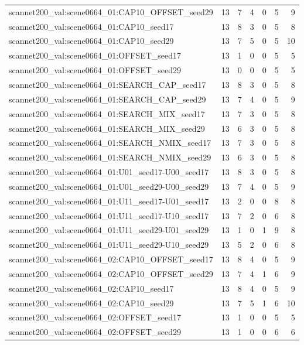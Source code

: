 \begin{table}[t]
\begin{tabular}{lrrrrrr}
scannet200\_val:scene0664\_01:CAP10\_OFFSET\_seed29 & 13 & 7 & 4 & 0 & 5 & 9 \\
scannet200\_val:scene0664\_01:CAP10\_seed17 & 13 & 8 & 3 & 0 & 5 & 8 \\
scannet200\_val:scene0664\_01:CAP10\_seed29 & 13 & 7 & 5 & 0 & 5 & 10 \\
scannet200\_val:scene0664\_01:OFFSET\_seed17 & 13 & 1 & 0 & 0 & 5 & 5 \\
scannet200\_val:scene0664\_01:OFFSET\_seed29 & 13 & 0 & 0 & 0 & 5 & 5 \\
scannet200\_val:scene0664\_01:SEARCH\_CAP\_seed17 & 13 & 8 & 3 & 0 & 5 & 8 \\
scannet200\_val:scene0664\_01:SEARCH\_CAP\_seed29 & 13 & 7 & 4 & 0 & 5 & 9 \\
scannet200\_val:scene0664\_01:SEARCH\_MIX\_seed17 & 13 & 7 & 3 & 0 & 5 & 8 \\
scannet200\_val:scene0664\_01:SEARCH\_MIX\_seed29 & 13 & 6 & 3 & 0 & 5 & 8 \\
scannet200\_val:scene0664\_01:SEARCH\_NMIX\_seed17 & 13 & 7 & 3 & 0 & 5 & 8 \\
scannet200\_val:scene0664\_01:SEARCH\_NMIX\_seed29 & 13 & 6 & 3 & 0 & 5 & 8 \\
scannet200\_val:scene0664\_01:U01\_seed17-U00\_seed17 & 13 & 8 & 3 & 0 & 5 & 8 \\
scannet200\_val:scene0664\_01:U01\_seed29-U00\_seed29 & 13 & 7 & 4 & 0 & 5 & 9 \\
scannet200\_val:scene0664\_01:U11\_seed17-U01\_seed17 & 13 & 2 & 0 & 0 & 8 & 8 \\
scannet200\_val:scene0664\_01:U11\_seed17-U10\_seed17 & 13 & 7 & 2 & 0 & 6 & 8 \\
scannet200\_val:scene0664\_01:U11\_seed29-U01\_seed29 & 13 & 1 & 0 & 1 & 9 & 8 \\
scannet200\_val:scene0664\_01:U11\_seed29-U10\_seed29 & 13 & 5 & 2 & 0 & 6 & 8 \\
scannet200\_val:scene0664\_02:CAP10\_OFFSET\_seed17 & 13 & 8 & 4 & 0 & 5 & 9 \\
scannet200\_val:scene0664\_02:CAP10\_OFFSET\_seed29 & 13 & 7 & 4 & 1 & 6 & 9 \\
scannet200\_val:scene0664\_02:CAP10\_seed17 & 13 & 8 & 4 & 0 & 5 & 9 \\
scannet200\_val:scene0664\_02:CAP10\_seed29 & 13 & 7 & 5 & 1 & 6 & 10 \\
scannet200\_val:scene0664\_02:OFFSET\_seed17 & 13 & 1 & 0 & 0 & 5 & 5 \\
scannet200\_val:scene0664\_02:OFFSET\_seed29 & 13 & 1 & 0 & 0 & 6 & 6 \\

\end{tabular}
\end{table}
